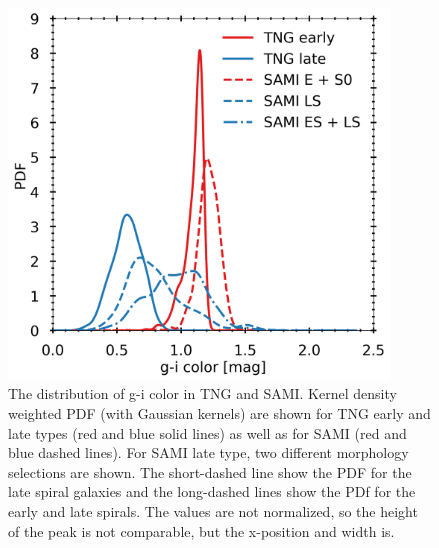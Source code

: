 \begin{figure}
    \centering
    \includegraphics[width=0.9\textwidth]{images/CB_PDF.png}
    \caption{The distribution of g-i color in TNG and SAMI. Kernel density weighted PDF (with Gaussian kernels) are shown for TNG early and late types (red and blue solid lines) as well as for SAMI (red and blue dashed lines). For SAMI late type, two different morphology selections are shown. The short-dashed line show the PDF for the late spiral galaxies and the long-dashed lines show the PDf for the early and late spirals. The values are not normalized, so the height of the peak is not comparable, but the x-position and width is.}
    \label{CB_PDF}
\end{figure}